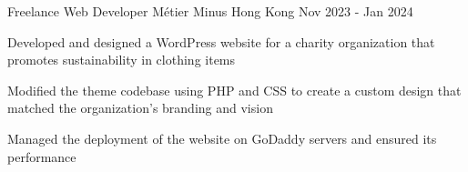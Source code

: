 
\begin{cventries}

  \cventry
  {Freelance Web Developer}
  {Métier Minus}
  {Hong Kong}
  {Nov 2023 - Jan 2024}
  {
    \begin{cvitems}
      \item {Developed and designed a WordPress website for a charity organization that promotes sustainability in clothing items}
      \item {Modified the theme codebase using PHP and CSS to create a custom design that matched the organization’s branding and vision}
      \item {Managed the deployment of the website on GoDaddy servers and ensured its performance}
    \end{cvitems}
  }


\end{cventries}
